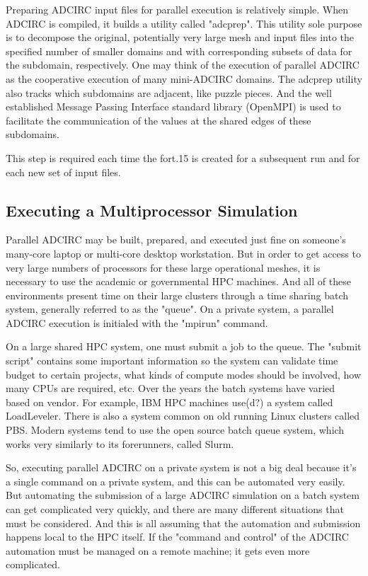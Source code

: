 \documentclass{article}
\begin{document}
Preparing ADCIRC input files for parallel execution is relatively simple. When
ADCIRC is compiled, it builds a utility called "adcprep". This utility sole
purpose is to decompose the original, potentially very large mesh and input
files into the specified number of smaller domains and with corresponding
subsets of data for the subdomain, respectively. One may think of the execution
of parallel ADCIRC as the cooperative execution of many mini-ADCIRC domains. The
adcprep utility also tracks which subdomains are adjacent, like puzzle pieces.
And the well established Message Passing Interface standard library (OpenMPI) is
used to facilitate the communication of the values at the shared edges of these
subdomains.

This step is required each time the fort.15 is created for a subsequent run and
for each new set of input files.

\subsection{Executing a Multiprocessor Simulation}

Parallel ADCIRC may be built, prepared, and executed just fine on someone's
many-core laptop or multi-core desktop workstation. But in order to get access
to very large numbers of processors for these large operational meshes, it is
necessary to use the academic or governmental HPC machines. And all of these
environments present time on their large clusters through a time sharing batch
system, generally referred to as the "queue". On a private system, a parallel
ADCIRC execution is initialed with the "mpirun" command.

On a large shared HPC system, one must submit a job to the queue. The "submit
script" contains some important information so the system can validate time
budget to certain projects, what kinds of compute modes should be involved, how
many CPUs are required, etc. Over the years the batch systems have varied based
on vendor. For example, IBM HPC machines use(d?) a system called LoadLeveler.
There is also a system common on old running Linux clusters called PBS. Modern
systems tend to use the open source batch queue system, which works very
similarly to its forerunners, called Slurm.

So, executing parallel ADCIRC on a private system is not a big deal because it's
a single command on a private system, and this can be automated very easily. But
automating the submission of a large ADCIRC simulation on a batch system can get
complicated very quickly, and there are many different situations that must be
considered. And this is all assuming that the automation and submission happens
local to the HPC itself. If the "command and control" of the ADCIRC automation
must be managed on a remote machine; it gets even more complicated.
\end{document}
